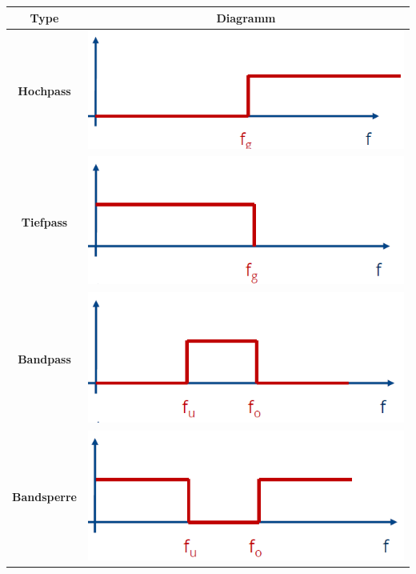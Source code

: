 \documentclass[12pt,a4paper]{article}
\begin{document}
\begin{tabular}{|c|c|}
\hline
Type & Diagramm\\
\hline
\textbf{Hochpass} & \includegraphics[scale=0.3]{./resources/hochpass.png}\\
\hline
\textbf{Tiefpass} & \includegraphics[scale=0.3]{./resources/tiefpass.png}\\
\hline
\textbf{Bandpass} & \includegraphics[scale=0.3]{./resources/bandpass.png}\\
\hline
\textbf{Bandsperre} & \includegraphics[scale=0.3]{./resources/bandsperre.png}\\
\hline
\end{tabular}
\end{document}
